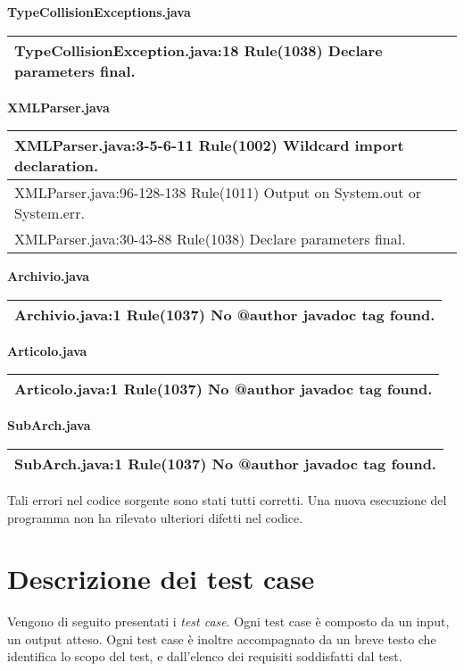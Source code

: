 \textbf{TypeCollisionExceptions.java}
\begin{center}
\begin{tabular}{|p{12cm}|} \hline
TypeCollisionException.java:18 Rule(1038) Declare parameters final.\\ \hline
\end{tabular}
\end{center}

\textbf{XMLParser.java}
\begin{center}
\begin{tabular}{|p{12cm}|} \hline
XMLParser.java:3-5-6-11 Rule(1002) Wildcard import declaration.\\ \hline
XMLParser.java:96-128-138 Rule(1011) Output on System.out or System.err.\\ \hline
XMLParser.java:30-43-88 Rule(1038) Declare parameters final.\\ \hline
\end{tabular}
\end{center}

\textbf{Archivio.java}
\begin{center}
\begin{tabular}{|p{12cm}|} \hline
Archivio.java:1 Rule(1037) No @author javadoc tag found.\\ \hline
\end{tabular}
\end{center}

\textbf{Articolo.java}
\begin{center}
\begin{tabular}{|p{12cm}|} \hline
Articolo.java:1 Rule(1037) No @author javadoc tag found.\\ \hline
\end{tabular}
\end{center}

\textbf{SubArch.java}
\begin{center}
\begin{tabular}{|p{12cm}|} \hline
SubArch.java:1 Rule(1037) No @author javadoc tag found.\\ \hline
\end{tabular}
\end{center}

Tali errori nel codice sorgente sono stati tutti corretti. Una nuova esecuzione del programma non ha rilevato ulteriori difetti nel codice.

\chapter{Descrizione dei test case}
Vengono di seguito presentati i \textit{test case}. Ogni test case \`e composto da un input, un output atteso. Ogni test case \`e inoltre accompagnato da un breve testo che identifica lo scopo del test, e dall'elenco dei requisiti soddisfatti dal test.

